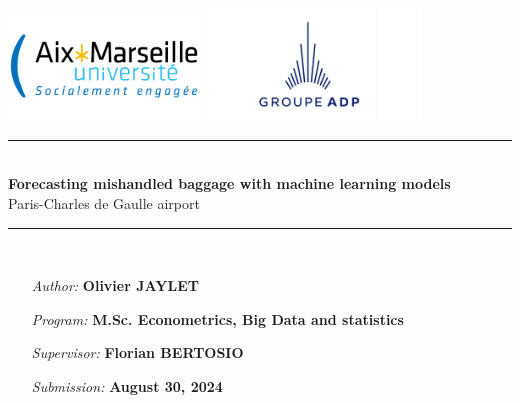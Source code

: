 \documentclass[12pt]{article}
\begin{document}
\newcommand{\HRule}{\rule{\linewidth}{0.5mm}} 

\thispagestyle{empty}
\hspace{10cm}
\begin{center}

\vfill
\begin{center}
  \includegraphics[width=0.38\textwidth]{AMU logo.png}
  \hfill
  \includegraphics[width=0.43\textwidth]{logo_Groupe_ADP.jpg}
\end{center}
\vfill


\vspace{0.5cm}

\HRule \\[0.4cm]
{ \huge \textbf{Forecasting mishandled baggage with machine learning models} \\[0.5cm] 
Paris-Charles de Gaulle airport
}\\[0.4cm]
\HRule \\[8cm]
\begin{minipage}[t]{0.7\textwidth}
	\begin{itemize}
    \item[\emph{Author:}] \textbf{Olivier JAYLET}
    \item[\emph{Program:}] \textbf{M.Sc. Econometrics, Big Data and statistics}
    \item[\emph{Supervisor:}] \textbf{Florian BERTOSIO}
    \item[\emph{Submission:}] \textbf{August 30, 2024}
	\end{itemize}
\end{minipage}

\end{center}
\end{document}
